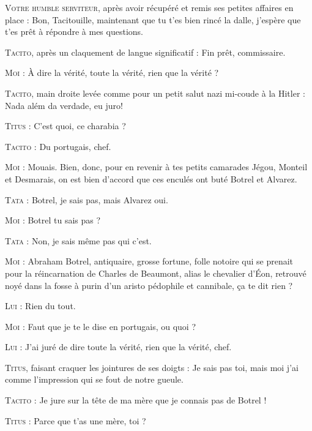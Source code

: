 \begin{dialogue}

\textsc{Votre humble serviteur}, après avoir récupéré et remis ses petites affaires en place : Bon, Tacitouille, maintenant que tu t’es bien rincé la dalle, j’espère que t’es prêt à répondre à mes questions.

\textsc{Tacito}, après un claquement de langue significatif : Fin prêt, commissaire.

\textsc{Moi} : À dire la vérité, toute la vérité, rien que la vérité ?

\textsc{Tacito}, main droite levée comme pour un petit salut nazi mi-coude à la Hitler : \foreignlanguage{portuguese}{Nada além da verdade, eu juro!}

\textsc{Titus} : C’est quoi, ce charabia ?

\textsc{Tacito} : Du portugais, chef.

\textsc{Moi} : Mouais. Bien, donc, pour en revenir à tes petits camarades Jégou, Monteil et Desmarais, on est bien d’accord que ces enculés ont buté Botrel et Alvarez.

\textsc{Tata} : Botrel, je sais pas, mais Alvarez oui.

\textsc{Moi} : Botrel tu sais pas ?

\textsc{Tata} : Non, je sais même pas qui c’est.

\textsc{Moi} : Abraham Botrel, antiquaire, grosse fortune, folle notoire qui se prenait pour la réincarnation de Charles de Beaumont, alias le chevalier d’Éon, retrouvé noyé dans la fosse à purin d’un aristo pédophile et cannibale, ça te dit rien ?

\textsc{Lui} : Rien du tout.

\textsc{Moi} : Faut que je te le dise en portugais, ou quoi ?

\textsc{Lui} : J’ai juré de dire toute la vérité, rien que la vérité, chef.

\textsc{Titus}, faisant craquer les jointures de ses doigts : Je sais pas toi, mais moi j’ai comme l’impression qui se fout de notre gueule.

\textsc{Tacito} : Je jure sur la tête de ma mère que je connais pas de Botrel !

\textsc{Titus} : Parce que t’as une mère, toi ?


\end{dialogue}
